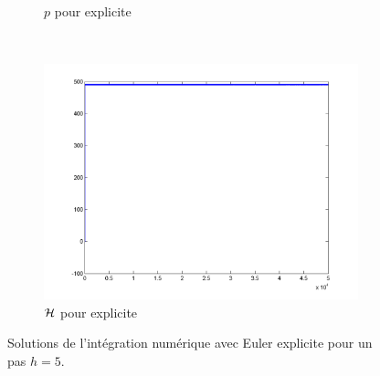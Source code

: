\begin{figure}
\begin{subfigure}[b]{0.3\textwidth}
    \caption{$p$ pour explicite}
    \label{fig:q1_explicite_rate_p}
  \end{subfigure}
  ~
  \begin{subfigure}[b]{0.3\textwidth}
    \includegraphics[width=\textwidth]{images/Q1_explicite_rate_H.png}
    \caption{$\mathcal{H}$ pour explicite}
    \label{fig:q1_explicite_rate_H}
  \end{subfigure}
\caption{Solutions de l'intégration numérique avec Euler explicite pour un pas $h=5$.}
\label{fig_rater}
\end{figure}

